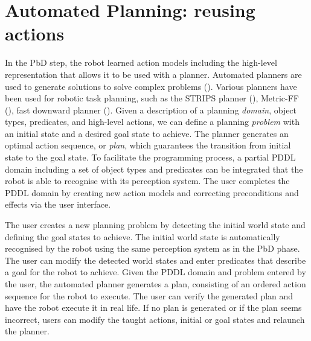 


\section{Automated Planning: reusing actions}\label{sec:AP}
In the PbD step, the robot learned action models including the high-level representation that allows it to be used with a planner. 
Automated planners are used to generate solutions to solve complex problems ().
Various planners have been used for robotic task planning, such as the STRIPS planner (\cite{she2014teaching}), Metric-FF (\cite{cubek2015high}), fast downward planner (\cite{abdo2013learning}). 
Given a description of a planning \textit{domain}, \ie object types, predicates, and high-level actions, we can define a planning \textit{problem} with an initial state and a desired goal state to achieve. 
The planner generates an optimal action sequence, or \textit{plan}, which guarantees the transition from initial state to the goal state. 
To facilitate the programming process, a partial PDDL domain including a set of object types and predicates can be integrated that the robot is able to recognise with its perception system.
The user completes the PDDL domain by creating new action models and correcting preconditions and effects via the user interface.

The user creates a new planning problem by detecting the initial world state and defining the goal states to achieve.
The initial world state is automatically recognised by the robot using the same perception system as in the PbD phase. 
The user can modify the detected world states and enter predicates that describe a goal for the robot to achieve.
Given the PDDL domain and problem entered by the user, the automated planner generates a plan, consisting of an ordered action sequence for the robot to execute. 
The user can verify the generated plan and have the robot execute it in real life.
If no plan is generated or if the plan seems incorrect, users can modify the taught actions, initial or goal states and relaunch the planner.


